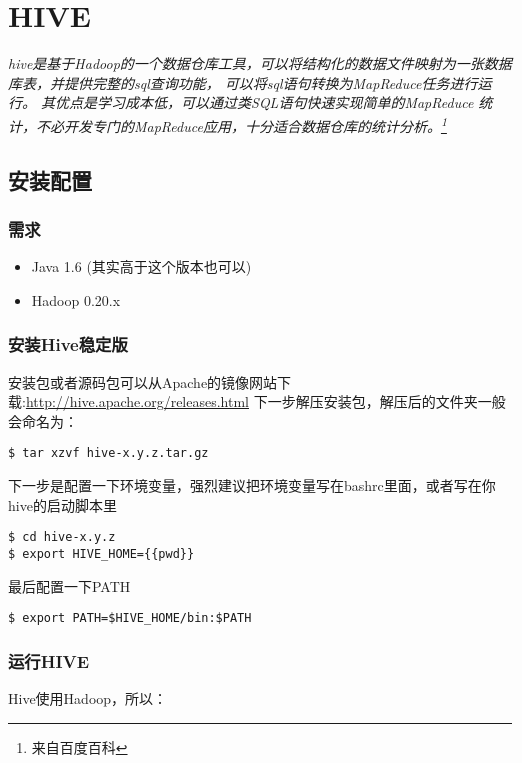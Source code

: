 \documentclass{article}
\begin{document}
\section{HIVE}
\textit{
hive是基于Hadoop的一个数据仓库工具，可以将结构化的数据文件映射为一张数据库表，并提供完整的sql查询功能，
可以将sql语句转换为MapReduce任务进行运行。 其优点是学习成本低，可以通过类SQL语句快速实现简单的MapReduce
统计，不必开发专门的MapReduce应用，十分适合数据仓库的统计分析。\footnote{来自百度百科}
}

\subsection{安装配置}
\subsubsection{需求}
\begin{itemize}
\item Java 1.6 (其实高于这个版本也可以)
\item Hadoop 0.20.x 
\end{itemize}

\subsubsection{安装Hive稳定版}
安装包或者源码包可以从Apache的镜像网站下载:\url{http://hive.apache.org/releases.html}
下一步解压安装包，解压后的文件夹一般会命名为：

\begin{verbatim}
$ tar xzvf hive-x.y.z.tar.gz
\end{verbatim}

下一步是配置一下环境变量，强烈建议把环境变量写在bashrc里面，或者写在你hive的启动脚本里

\begin{verbatim}
$ cd hive-x.y.z
$ export HIVE_HOME={{pwd}}
\end{verbatim}

最后配置一下PATH

\begin{verbatim}
$ export PATH=$HIVE_HOME/bin:$PATH
\end{verbatim}

\subsubsection{运行HIVE}
Hive使用Hadoop，所以：
\end{document}
